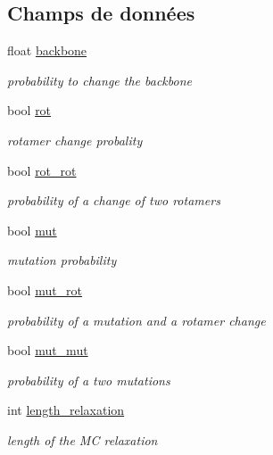 \subsection*{Champs de données}
\begin{DoxyCompactItemize}
\item 
float \hyperlink{struct_proba_a0d99db17b016f293ec4e7fb87a7659c5}{backbone}
\begin{DoxyCompactList}\small\item\em probability to change the backbone \end{DoxyCompactList}\item 
bool \hyperlink{struct_proba_a4fa9409e1684d2f42524567d2305b0c4}{rot}
\begin{DoxyCompactList}\small\item\em rotamer change probality \end{DoxyCompactList}\item 
bool \hyperlink{struct_proba_a0d48353cb0e8d591d25b1ec243cb5a9f}{rot\+\_\+rot}
\begin{DoxyCompactList}\small\item\em probability of a change of two rotamers \end{DoxyCompactList}\item 
bool \hyperlink{struct_proba_a832f8efe020ca9f60a5c9cf7a7aecda5}{mut}
\begin{DoxyCompactList}\small\item\em mutation probability \end{DoxyCompactList}\item 
bool \hyperlink{struct_proba_a9d6ba546e4120b335d1ce9eae107fbc0}{mut\+\_\+rot}
\begin{DoxyCompactList}\small\item\em probability of a mutation and a rotamer change \end{DoxyCompactList}\item 
bool \hyperlink{struct_proba_a754ae5112e69caa40b6f48703acc3133}{mut\+\_\+mut}
\begin{DoxyCompactList}\small\item\em probability of a two mutations \end{DoxyCompactList}\item 
int \hyperlink{struct_proba_ab672f681e88ef8d71a84091a9692bf56}{length\+\_\+relaxation}
\begin{DoxyCompactList}\small\item\em length of the M\+C relaxation \end{DoxyCompactList}\end{DoxyCompactItemize}


